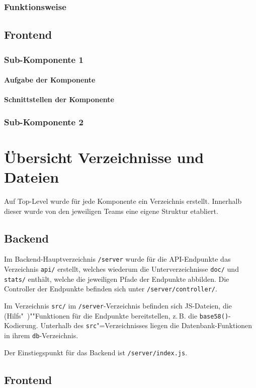\documentclass[a4paper,11pt,DIV=12,overfullrule=on]{scrreprt}%
\begin{document}
\subsubsection{Funktionsweise}
\subsection{Frontend}
\subsubsection{Sub-Komponente 1}
\paragraph{Aufgabe der Komponente}
\paragraph{Schnittstellen der Komponente}
\subsubsection{Sub-Komponente 2}
\section{Übersicht Verzeichnisse und Dateien}
Auf Top-Level wurde für jede Komponente ein Verzeichnis erstellt. Innerhalb dieser wurde von den jeweiligen Teams eine eigene Struktur etabliert.

\subsection{Backend}
Im Backend-Hauptverzeichnis \texttt{/server} wurde für die \ac{API}-Endpunkte das Verzeichnis \texttt{api/} erstellt, welches wiederum die Unterverzeichnisse \texttt{doc/} und \texttt{stats/} enthält, welche die jeweiligen Pfade der Endpunkte abbilden. Die Controller der Endpunkte befinden sich unter \texttt{/server/controller/}.

Im Verzeichnis \texttt{src/} im \texttt{/server}-Verzeichnis befinden sich \ac{JS}-Dateien, die (Hilfs"~)""Funktionen für die Endpunkte bereitstellen, z.\,B. die \texttt{base58()}-Kodierung. Unterhalb des \texttt{src}"=Verzeichnisses liegen die Datenbank-Funktionen in ihrem \texttt{db}-Verzeichnis.

Der Einstiegspunkt für das Backend ist \texttt{/server/index.js}.

\subsection{Frontend}
\end{document}
